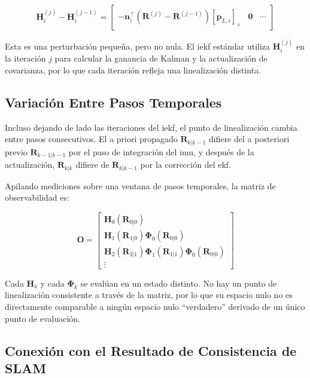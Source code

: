 \begin{equation}
\mathbf{H}_i^{(j)} - \mathbf{H}_i^{(j-1)} =
\begin{bmatrix}
-\mathbf{n}_i^\top (\mathbf{R}^{(j)} - \mathbf{R}^{(j-1)}) [\mathbf{p}_{L,i}]_\times & \mathbf{0} & \cdots
\end{bmatrix}
\label{eq:H-variation}
\end{equation}

Esta es una perturbación pequeña, pero no nula. El \gls{iekf} estándar utiliza
$\mathbf{H}_i^{(j)}$ en la iteración $j$ para calcular la ganancia de Kalman y
la actualización de covarianza, por lo que cada iteración refleja una
linealización distinta.

\subsection{Variación Entre Pasos Temporales}
\label{sec:fej-variacion-entre-pasos}

Incluso dejando de lado las iteraciones del \gls{iekf}, el punto de
linealización cambia entre pasos consecutivos. El a priori propagado
$\mathbf{R}_{k|k-1}$ difiere del a posteriori previo $\mathbf{R}_{k-1|k-1}$
por el paso de integración del \gls{imu}, y después de la actualización,
$\mathbf{R}_{k|k}$ difiere de $\mathbf{R}_{k|k-1}$ por la corrección del
\gls{ekf}.

Apilando mediciones sobre una ventana de pasos temporales, la matriz de
observabilidad es:

\begin{equation}
\mathbf{O} =
\begin{bmatrix}
\mathbf{H}_0(\mathbf{R}_{0|0}) \\
\mathbf{H}_1(\mathbf{R}_{1|0}) \boldsymbol{\Phi}_0(\mathbf{R}_{0|0}) \\
\mathbf{H}_2(\mathbf{R}_{2|1}) \boldsymbol{\Phi}_1(\mathbf{R}_{1|1}) \boldsymbol{\Phi}_0(\mathbf{R}_{0|0}) \\
\vdots
\end{bmatrix}
\label{eq:O-shifting}
\end{equation}

Cada $\mathbf{H}_k$ y cada $\boldsymbol{\Phi}_k$ se evalúan en un estado
distinto. No hay un punto de linealización consistente a través de la matriz,
por lo que su espacio nulo no es directamente comparable a ningún espacio nulo
``verdadero'' derivado de un único punto de evaluación.

\subsection{Conexión con el Resultado de Consistencia de SLAM}
\label{sec:fej-conexion-slam}

